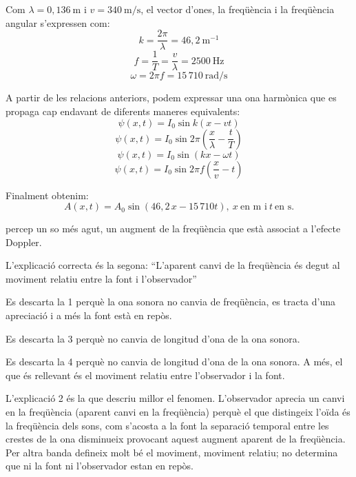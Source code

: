 \begin{solapartat}
 Com $\lambda = 0,136\ \mathrm{m}$ i $v = 340\ \mathrm{m/s}$, el vector d'ones, la freqüència i la freqüència angular s'expressen com:
\[ k = \frac{2\pi}{\lambda} = 46,2\ \mathrm{m}^{-1} \]
\[ f = \frac{1}{T} = \frac{v}{\lambda} = 2500\ \mathrm{Hz} \]
\[ \omega = 2\pi f = 15\,710\ \mathrm{rad/s} \]

 A partir de les relacions anteriors, podem expressar una ona harmònica que es propaga cap endavant de diferents maneres equivalents:
\[ \psi(x,t) = I_0\sin k(x-vt) \]
\[ \psi(x,t) = I_0\sin 2\pi\left(\frac{x}{\lambda}-\frac{t}{T}\right) \]
\[ \psi(x,t) = I_0\sin(kx-\omega t) \]
\[ \psi(x,t) = I_0\sin 2\pi f\left(\frac{x}{v}-t\right) \]

Finalment obtenim:
\[ A(x,t) = A_0\sin(46,2\,x-15\,710t),\ x\ \text{en m i}\ t\ \text{en s.} \]
\end{solapartat}

\begin{solapartat}
 percep un so més agut, un augment de la freqüència que està associat a l'efecte Doppler.

 L'explicació correcta és la segona: ``L'aparent canvi de la freqüència és degut al moviment relatiu entre la font i l'observador''

 Es descarta la 1 perquè la ona sonora no canvia de freqüència, es tracta d'una apreciació i a més la font està en repòs.

 Es descarta la 3 perquè no canvia de longitud d'ona de la ona sonora.

 Es descarta la 4 perquè no canvia de longitud d'ona de la ona sonora. A més, el que és rellevant és el moviment relatiu entre l'observador i la font.

 L'explicació 2 és la que descriu millor el fenomen. L'observador aprecia un canvi en la freqüència (aparent canvi en la freqüència) perquè el que distingeix l'oïda és la freqüència dels sons, com s'acosta a la font la separació temporal entre les crestes de la ona disminueix provocant aquest augment aparent de la freqüència. Per altra banda defineix molt bé el moviment, moviment relatiu; no determina que ni la font ni l'observador estan en repòs.
\end{solapartat}
